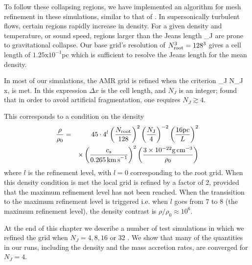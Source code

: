 \documentclass[../dissertation.tex]{subfiles}
\begin{document}
To follow these collapsing regions, we have implemented an algorithm 
for mesh refinement in these simulations, similar to that of \citet{2010ApJ...713..269F}.
In supersonically turbulent flows, certain regions rapidly increase in density.
For a given density and temperature, or sound speed, regions larger than the 
Jeans length
%
\be
\lambda_J \equiv {}  
\label{eq:hydro_Jeans_length}
\ee
%
are prone to gravitational collapse. Our base grid's resolution of $N_{\rm root}^3 = 128^3$ 
gives a cell length of 
$1.25 \text{x} 10^{-1}$pc which is sufficient to resolve the Jeans 
length for the mean density.

In most of our simulations, the AMR grid is refined when the \citet{1997ApJ...489L.179T} criterion 
%
\be
\lambda_J \le N_J \Delta x, 
\ee
%
is met.
In this expression $\Delta x$ is the cell length, and $N_J$ is an integer; \citet{1997ApJ...489L.179T} found that in order to avoid artificial fragmentation, one requires $N_J\gtrsim 4$.

This corresponds to a condition on the density 
%
\begin{eqnarray}
\frac{\rho}{\rho_0} &=& 45 \cdot 4^l
\left( \frac{N_{\rm root}}{128} \right)^2 
\left( \frac{N_{\rm J}}{4} \right)^{-2} 
\left( \frac{16 \rm{pc}}{L} \right)^2 \nonumber\\
&&\times\left( \frac{c_s}{0.265\, {\rm km\, s}^{-1}} \right)^2
\left( \frac{3 \times10^{-22} {\rm g\, cm}^{-3}}{\rho_0} \right)
\label{eq:hydro_refinement_criteria}
\end{eqnarray}
%
where $l$ is the refinement level, with $l = 0$ corresponding to the root grid.
When this density condition is met the local grid is refined by a factor of 2, 
provided that the maximum refinement level has not been reached. 
When the transisition to the maximum refinement level is triggered i.e. when $l$ goes from $7$ to $8$ (the maximum refinement level),
the density contrast is $\rho / \rho_0 \approx 10^6$. 

At the end of this chapter we describe a number of test simulations in which we refined the grid when 
$N_J=4, 8, 16$ or $32$ \citep{2011ApJ...731...62F}. We show that many of the quantities in our runs, including the density and the mass accretion rates, are converged for $N_J=4$.
\end{document}
